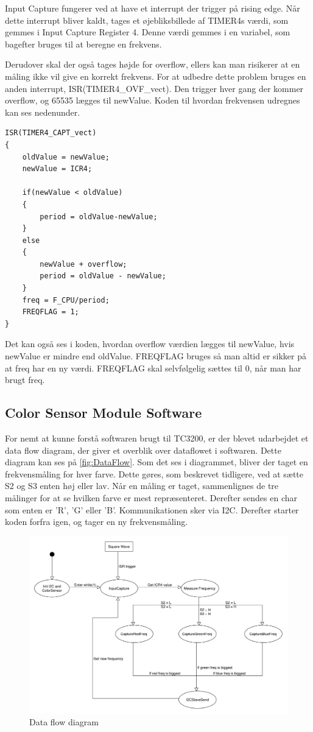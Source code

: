 Input Capture fungerer ved at have et interrupt der trigger på rising edge. Når dette interrupt bliver kaldt, tages et øjebliksbillede af TIMER4s værdi, som gemmes i Input Capture Register 4. Denne værdi gemmes i en variabel, som bagefter bruges til at beregne en frekvens. 

Derudover skal der også tages højde for overflow, ellers kan man risikerer at en måling ikke vil give en korrekt frekvens. For at udbedre dette problem bruges en anden interrupt, ISR(TIMER4\_OVF\_vect). Den trigger hver gang der kommer overflow, og 65535 lægges til newValue. Koden til hvordan frekvensen udregnes kan ses nedenunder.

\newpage
\begin{lstlisting}
ISR(TIMER4_CAPT_vect)
{
	oldValue = newValue;
	newValue = ICR4;
	
	if(newValue < oldValue)
	{
		period = oldValue-newValue;
	}
	else
	{
		newValue + overflow;
		period = oldValue - newValue;
	}
	freq = F_CPU/period;
	FREQFLAG = 1;
}

\end{lstlisting}

Det kan også ses i koden, hvordan overflow værdien lægges til newValue, hvis newValue er mindre end oldValue. FREQFLAG bruges så man altid er sikker på at freq har en ny værdi. FREQFLAG skal selvfølgelig sættes til 0, når man har brugt freq.

\subsection{Color Sensor Module Software}
For nemt at kunne forstå softwaren brugt til TC3200, er der blevet udarbejdet et data flow diagram, der giver et overblik over dataflowet i softwaren. Dette diagram kan ses på \autoref{fig:DataFlow}. Som det ses i diagrammet, bliver der taget en frekvensmåling for hver farve. Dette gøres, som beskrevet tidligere, ved at sætte S2 og S3 enten høj eller lav. Når en måling er taget, sammenlignes de tre målinger for at se hvilken farve er mest repræsenteret. Derefter sendes en char som enten er 'R', 'G' eller 'B'. Kommunikationen sker via I2C. Derefter starter koden forfra igen, og tager en ny frekvensmåling.

\begin{figure}[H]
	\centering
	\includegraphics[width = 500pt]{Img/DataFlowDiagram.pdf}
	\caption{Data flow diagram}
	\label{fig:DataFlow}
\end{figure}
